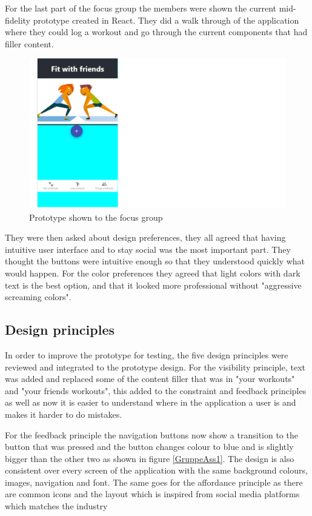 For the last part of the focus group the members were shown the current mid-fidelity prototype created in React. They did a walk through of the application where they could log a workout and go through the current components that had filler content.
\begin{figure}[H]
    \centering
    \includegraphics[scale=0.6]{figures/appenSaaLangt2.png}
    \caption{Prototype shown to the focus group}
    \label{ReactProt}
\end{figure}

They were then asked about design preferences, they all agreed that having intuitive user interface and to stay social was the most important part. They thought the buttons were intuitive enough so that they understood quickly what would happen.
For the color preferences they agreed that light colors with dark text is the best option, and that it looked more professional without "aggressive screaming colors".
\subsection{Design principles}
In order to improve the prototype for testing, the five design principles were reviewed and integrated to the prototype design. For the visibility principle, text was added and replaced some of the content filler that was in "your workouts" and "your friends workouts", this added to the constraint and feedback principles as well as now it is easier to understand where in the application a user is and makes it harder to do mistakes.

For the feedback principle the navigation buttons now show a transition to the button that was pressed and the button changes colour to blue and is slightly bigger than the other two as shown in figure \ref{GruppeAss1}. The design is also consistent over every screen of the application with the same background colours, images, navigation and font. The same goes for the affordance principle as there are common icons and the layout which is inspired from social media platforms which matches the industry


